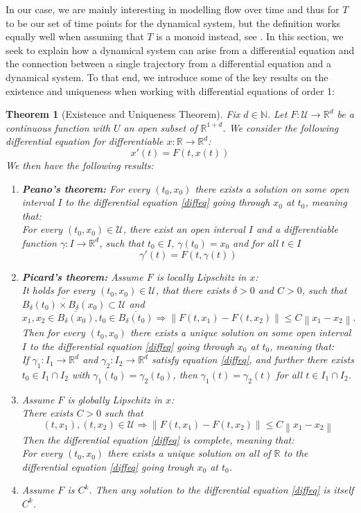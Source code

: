 \documentclass[11pt, a4paper]{memoir}
\theoremstyle{break}
\newtheorem{thm}{Theorem}
\theoremstyle{break}
\theoremstyle{nonumberplain}
\newcommand{\mN}{\mathbb{N}}
\newcommand{\mR}{\mathbb{R}}
\newcommand{\norm}[1]{\left\lVert#1\right\rVert}
\begin{document}
In our case, we are mainly interesting in modelling flow over time and thus for $T$ to be our set of time points for the dynamical system, but the definition works equally well when assuming that $T$ is a monoid instead, see \cite{inbook}. In this section, we seek to explain how a dynamical system can arise from a differential equation and the connection between a single trajectory from a differential equation and a dynamical system. To that end, we introduce some of the key results on the existence and uniqueness when working with differential equations of order 1:
\begin{thm}[Existence and Uniqueness Theorem]\label{ThmDiffEq}
Fix $d\in \mN$. Let $F:\mathcal{U}\to\mR^d$ be a continuous function with $U$ an open subset of $\mR^{1+d}$. We consider the following differential equation for differentiable $x:\mR\to\mR^{d}$:
\begin{equation}\label{diffeq}
x'(t)=F\left(t,x(t)\right)
\end{equation}
We then have the following results:
\begin{enumerate}[label=(\roman*)]
	\item \textbf{Peano's theorem:} For every $(t_0,x_0)$ there exists a solution on some open interval $I$ to the differential equation \ref{diffeq} going through $x_0$ at $t_0$, meaning that:\\
	For every $(t_0,x_0)\in \mathcal{U}$, there exist an open interval $I$ and a differentiable function $\gamma: I\to \mR^d$, such that $t_0\in I$, $\gamma(t_0)=x_0$ and for all $t\in I$
		$$\gamma'(t)=F\left(t,\gamma(t)\right)$$
	\item \textbf{Picard's theorem:} Assume $F$ is locally Lipschitz in $x$:\\[5pt]
	It holds for every $(t_0,x_0)\in \mathcal{U}$, that there exists $\delta>0$ and $C>0$, such that $\overline{B_\delta(t_0)\times B_\delta(x_0)}\subset \mathcal{U}$ and
	$$x_1,x_2\in \overline{B_\delta(x_0)}, t_0\in \overline{B_\delta(t_0)}\Rightarrow \norm{F(t,x_1)-F(t,x_2)}\leqslant C\norm{x_1-x_2}.$$
	Then for every $(t_0,x_0)$ there exists a unique solution on some open interval $I$ to the differential equation \ref{diffeq} going through $x_0$ at $t_0$, meaning that:\\
	If $\gamma_1: I_1\to\mR^d$ and $\gamma_2:I_2\to\mR^d$ satisfy equation \ref{diffeq}, and further there exists $t_0\in I_1\cap I_2$ with $\gamma_1(t_0)=\gamma_2(t_0)$, then $\gamma_1(t)=\gamma_2(t)$ for all $t\in I_1\cap I_2$.
	\item Assume $F$ is globally Lipschitz in $x$:\\[5pt]
	There exists $C>0$ such that
	$$(t,x_1),(t,x_2)\in \mathcal{U}\Rightarrow \norm{F(t,x_1)-F(t,x_2)}\leq C\norm{x_1-x_2}$$
	Then the differential equation \ref{diffeq} is complete, meaning that:\\
	For every $(t_0,x_0)$ there exists a unique solution on all of $\mR$ to the differential equation \ref{diffeq} going trough $x_0$ at $t_0$.
	\item Assume $F$ is $C^k$. Then any solution to the differential equation \ref{diffeq} is itself $C^k$.
\end{enumerate}
\end{thm}
\end{document}
